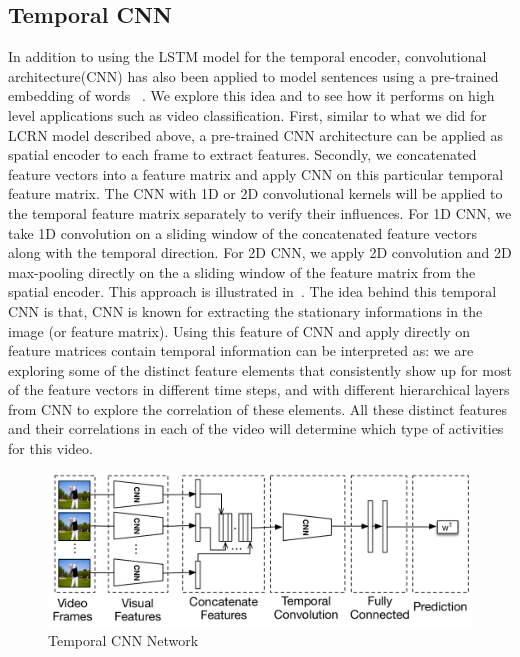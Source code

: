\subsection{Temporal CNN}
In addition to using the LSTM model for the temporal encoder, convolutional architecture(CNN) has also been applied to model sentences using a pre-trained embedding of words ~\cite{cnnSC,cnnMNLS}. We explore this idea and to see how it performs on high level applications such as video classification. First, similar to what we did for LCRN model described above, a pre-trained CNN architecture can be applied as spatial encoder to each frame to extract features. 
Secondly, we concatenated feature vectors into a feature matrix and apply CNN on this particular temporal feature matrix. The CNN with 1D or 2D convolutional kernels will be applied to the temporal feature matrix separately to verify their influences. For 1D CNN, we take 1D convolution on a sliding window of the concatenated feature vectors along with the temporal direction. For 2D CNN, we apply 2D convolution and 2D max-pooling directly on the a sliding window of the feature matrix from the spatial encoder. This approach is illustrated in~.
The idea behind this temporal CNN is that, CNN is known for extracting the stationary informations in the image (or feature matrix). Using this feature of CNN and apply directly on feature matrices contain temporal information can be interpreted as: we are exploring some of the distinct feature elements that consistently show up for most of the feature vectors in different time steps, and with different hierarchical layers from CNN to explore the correlation of these elements. All these distinct features and their correlations in each of the video will determine which type of activities for this video. 

\begin{figure}
  \centering
  \includegraphics[width=1.0\linewidth]{figs/tnn}
  \caption{Temporal CNN Network}
  \label{fig:tnn}
\end{figure}

